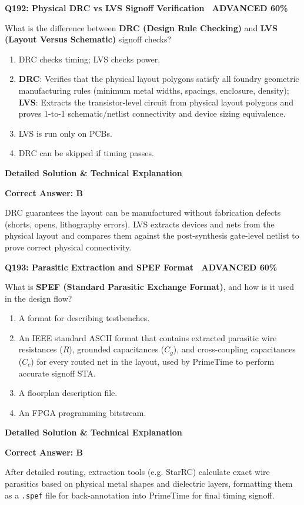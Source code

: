 \documentclass[11pt,a4paper]{article}
\newcommand{\badgeadv}{{\color{white}\colorbox{advred}{\bfseries\sffamily\tiny\ ADVANCED 60\%\ }}}
\newenvironment{qbox}[2]{%
  \begin{mdframed}[style=qstyle]%
  {\bfseries\sffamily\color{primaryblue}#1 \hfill #2}\par\vspace{2pt}%
}{%
  \end{mdframed}%
}
\newenvironment{ansbox}{%
  \begin{mdframed}[style=ansstyle]%
  {\bfseries\sffamily\color{ansgreen}\small Detailed Solution \& Technical Explanation}\par\vspace{2pt}\small%
}{%
  \end{mdframed}%
}
\begin{document}
\begin{qbox}{Q192: Physical DRC vs LVS Signoff Verification}{\badgeadv}
What is the difference between \textbf{DRC (Design Rule Checking)} and \textbf{LVS (Layout Versus Schematic)} signoff checks?
\begin{enumerate}[label=\textbf{\Alph*.}]
  \item DRC checks timing; LVS checks power.
  \item \textbf{DRC}: Verifies that the physical layout polygons satisfy all foundry geometric manufacturing rules (minimum metal widths, spacings, enclosure, density); \textbf{LVS}: Extracts the transistor-level circuit from physical layout polygons and proves 1-to-1 schematic/netlist connectivity and device sizing equivalence.
  \item LVS is run only on PCBs.
  \item DRC can be skipped if timing passes.
\end{enumerate}
\end{qbox}
\begin{ansbox}
\textbf{Correct Answer: B}

DRC guarantees the layout can be manufactured without fabrication defects (shorts, opens, lithography errors). LVS extracts devices and nets from the physical layout and compares them against the post-synthesis gate-level netlist to prove correct physical connectivity.
\end{ansbox}

\begin{qbox}{Q193: Parasitic Extraction and SPEF Format}{\badgeadv}
What is \textbf{SPEF (Standard Parasitic Exchange Format)}, and how is it used in the design flow?
\begin{enumerate}[label=\textbf{\Alph*.}]
  \item A format for describing testbenches.
  \item An IEEE standard ASCII format that contains extracted parasitic wire resistances ($R$), grounded capacitances ($C_g$), and cross-coupling capacitances ($C_c$) for every routed net in the layout, used by PrimeTime to perform accurate signoff STA.
  \item A floorplan description file.
  \item An FPGA programming bitstream.
\end{enumerate}
\end{qbox}
\begin{ansbox}
\textbf{Correct Answer: B}

After detailed routing, extraction tools (e.g. StarRC) calculate exact wire parasitics based on physical metal shapes and dielectric layers, formatting them as a \texttt{.spef} file for back-annotation into PrimeTime for final timing signoff.
\end{ansbox}
\end{document}
